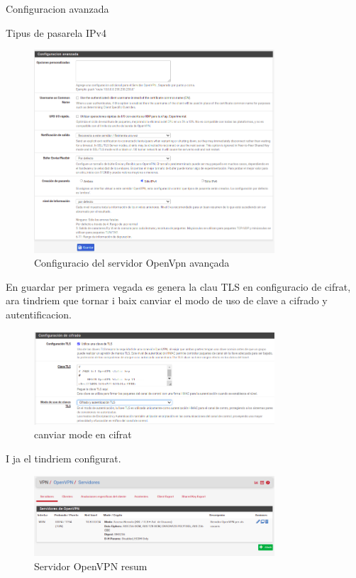 \documentclass[
  10pt,
]{krantz}
\begin{document}
Configuracion avanzada

Tipus de pasarela IPv4

\begin{figure}
\centering
\includegraphics[width=0.8\textwidth,height=\textheight]{imatges/proxmox/Conf_vpn_server5.png}
\caption{Configuracio del servidor OpenVpn avançada}
\end{figure}

En guardar per primera vegada es genera la clau TLS en configuracio de cifrat, ara tindriem que tornar i baix canviar el modo de uso de clave a cifrado y autentificacion.

\begin{figure}
\centering
\includegraphics[width=0.8\textwidth,height=\textheight]{imatges/proxmox/Conf_vpn_server6.png}
\caption{canviar mode en cifrat}
\end{figure}

I ja el tindriem configurat.

\begin{figure}
\centering
\includegraphics[width=0.8\textwidth,height=\textheight]{imatges/proxmox/conf_vpn_server_final.png}
\caption{Servidor OpenVPN resum}
\end{figure}
\end{document}
